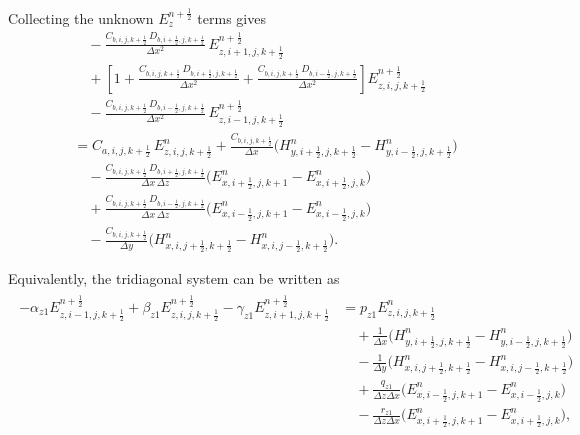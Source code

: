 \documentclass{article}
\numberwithin{equation}{section}
\numberwithin{figure}{section}
\begin{document}
Collecting the unknown $E_{z}^{n+\frac12}$ terms gives
\begin{equation}
    \begin{aligned}
         & \quad -\frac{C_{b,i,j,k+\tfrac12}\,D_{b,i+\tfrac12,j,k+\tfrac12}}{\Delta x^2}\, E_{z,i+1,j,k+\tfrac12}^{n+\frac12}                                                                                     \\
         & \quad + \left[1+\frac{C_{b,i,j,k+\tfrac12}\,D_{b,i+\tfrac12,j,k+\tfrac12}}{\Delta x^2} +\frac{C_{b,i,j,k+\tfrac12}\,D_{b,i-\tfrac12,j,k+\tfrac12}}{\Delta x^2}\right] E_{z,i,j,k+\tfrac12}^{n+\frac12} \\
         & \quad - \frac{C_{b,i,j,k+\tfrac12}\,D_{b,i-\tfrac12,j,k+\tfrac12}}{\Delta x^2}\, E_{z,i-1,j,k+\tfrac12}^{n+\frac12}                                                                                    \\
         & = C_{a,i,j,k+\tfrac12}\, E_{z,i,j,k+\tfrac12}^{n} + \frac{C_{b,i,j,k+\tfrac12}}{\Delta x} \Big(H_{y,i+\tfrac12,j,k+\tfrac12}^{n}-H_{y,i-\tfrac12,j,k+\tfrac12}^{n}\Big)                                \\
         & \quad - \frac{C_{b,i,j,k+\tfrac12}\,D_{b,i+\tfrac12,j,k+\tfrac12}}{\Delta x\,\Delta z} \Big(E_{x,i+\tfrac12,j,k+1}^{n}-E_{x,i+\tfrac12,j,k}^{n}\Big)                                                   \\
         & \quad + \frac{C_{b,i,j,k+\tfrac12}\,D_{b,i-\tfrac12,j,k+\tfrac12}}{\Delta x\,\Delta z} \Big(E_{x,i-\tfrac12,j,k+1}^{n}-E_{x,i-\tfrac12,j,k}^{n}\Big)                                                   \\
         & \quad - \frac{C_{b,i,j,k+\tfrac12}}{\Delta y} \Big(H_{x,i,j+\tfrac12,k+\tfrac12}^{n}-H_{x,i,j-\tfrac12,k+\tfrac12}^{n}\Big).
    \end{aligned}
\end{equation}

Equivalently, the tridiagonal system can be written as
\begin{align}
    \begin{split}
        -\alpha_{z1}E_{z,i-1,j,k+\tfrac12}^{n+\frac12} + \beta_{z1}E_{z,i,j,k+\tfrac12}^{n+\frac12} - \gamma_{z1}E_{z,i+1,j,k+\tfrac12}^{n+\frac12}
         & = p_{z1}E_{z,i,j,k+\tfrac12}^{n}                                                                       \\
         & \quad +\frac{1}{\Delta x}\Big(H_{y,i+\tfrac12,j,k+\tfrac12}^{n}-H_{y,i-\tfrac12,j,k+\tfrac12}^{n}\Big) \\
         & \quad -\frac{1}{\Delta y}\Big(H_{x,i,j+\tfrac12,k+\tfrac12}^{n}-H_{x,i,j-\tfrac12,k+\tfrac12}^{n}\Big) \\
         & \quad +\frac{q_{z1}}{\Delta z\Delta x}\Big(E_{x,i-\tfrac12,j,k+1}^{n}-E_{x,i-\tfrac12,j,k}^{n}\Big)    \\
         & \quad -\frac{r_{z1}}{\Delta z\Delta x}\Big(E_{x,i+\tfrac12,j,k+1}^{n}-E_{x,i+\tfrac12,j,k}^{n}\Big),
    \end{split}
    \label{eq:first-e-ez-adi-tridiagonal}
\end{align}
\end{document}
